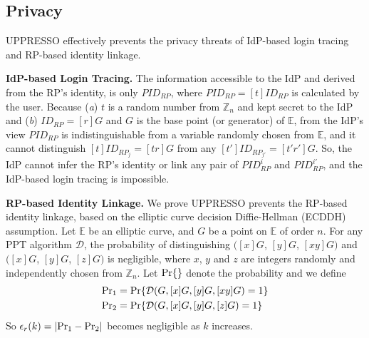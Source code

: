 


\subsection{Privacy}
UPPRESSO effectively prevents the privacy threats of IdP-based login tracing and RP-based identity linkage.

\vspace{0.5mm}
\noindent\textbf{IdP-based Login Tracing.}
The information accessible to the IdP and derived from the RP's identity,
    is only $PID_{RP}$, where $PID_{RP} = [t]ID_{RP}$ is calculated by the user.
Because  (\emph{a}) $t$ is a random number from $\mathbb{Z}_n$ and kept secret to the IdP
 and (\emph{b}) $ID_{RP} = [r]G$ and $G$ is the base point (or generator) of $\mathbb{E}$,
from the IdP's view
$PID_{RP}$
is indistinguishable from a variable randomly chosen from $\mathbb{E}$,
    and it cannot distinguish $[t]ID_{RP_j} = [tr]G$ from any $[t']ID_{RP_{j'}} = [t'r']G$.
So, the IdP cannot infer the RP's identity or link any pair of $PID_{RP}^i$ and $PID_{RP}^{i'}$,
    and the IdP-based login tracing is impossible.

\vspace{0.5mm}
\noindent\textbf{RP-based Identity Linkage.}
We prove UPPRESSO prevents the RP-based identity linkage,
 based on the elliptic curve decision Diffie-Hellman (ECDDH) assumption. %
%
Let $\mathbb{E}$ be an elliptic curve,
    and $G$ be a point on $\mathbb{E}$ of order $n$.
For any PPT algorithm $\mathcal{D}$, the probability of distinguishing
 $([x]G$, $[y]G$, $[xy]G)$ and $([x]G$, $[y]G$, $[z]G)$
is negligible,
 where $x$, $y$ and $z$ are integers randomly and independently chosen from $\mathbb{Z}_n$.
Let  ${\rm Pr}\{\}$ denote the probability and
 we define
\begin{align*}
&{\rm Pr}_1 =  {\rm Pr}\{\mathcal{D}(G, [x]G, [y]G, [xy]G)=1\} \\
&{\rm Pr}_2 =  {\rm Pr}\{\mathcal{D}(G, [x]G, [y]G, [z]G)=1\}
\end{align*}
So $\epsilon_{r}(k) = |{\rm Pr}_1 - {\rm Pr}_2|$ becomes negligible as $k$ increases.


